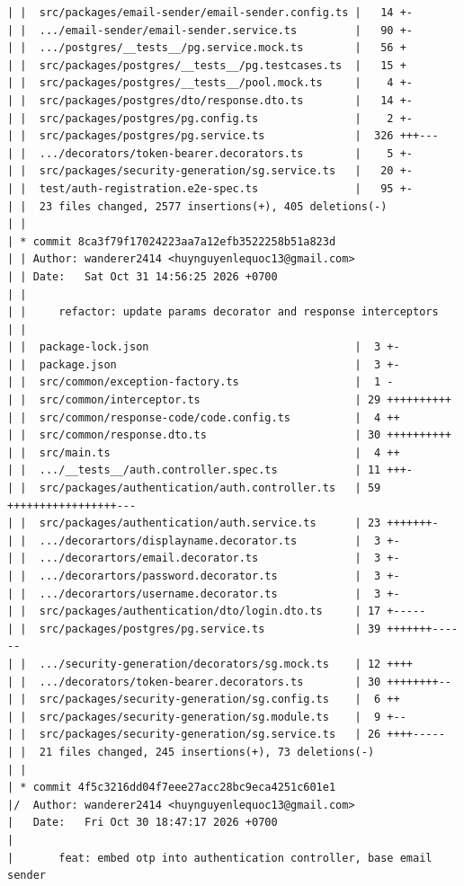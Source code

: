 \documentclass[12pt]{article}
\begin{document}
\begin{lstlisting}[numbers=none,breaklines=true]
| |  src/packages/email-sender/email-sender.config.ts |   14 +-
| |  .../email-sender/email-sender.service.ts         |   90 +-
| |  .../postgres/__tests__/pg.service.mock.ts        |   56 +
| |  src/packages/postgres/__tests__/pg.testcases.ts  |   15 +
| |  src/packages/postgres/__tests__/pool.mock.ts     |    4 +-
| |  src/packages/postgres/dto/response.dto.ts        |   14 +-
| |  src/packages/postgres/pg.config.ts               |    2 +-
| |  src/packages/postgres/pg.service.ts              |  326 +++---
| |  .../decorators/token-bearer.decorators.ts        |    5 +-
| |  src/packages/security-generation/sg.service.ts   |   20 +-
| |  test/auth-registration.e2e-spec.ts               |   95 +-
| |  23 files changed, 2577 insertions(+), 405 deletions(-)
| |
| * commit 8ca3f79f17024223aa7a12efb3522258b51a823d
| | Author: wanderer2414 <huynguyenlequoc13@gmail.com>
| | Date:   Sat Oct 31 14:56:25 2026 +0700
| |
| |     refactor: update params decorator and response interceptors
| |
| |  package-lock.json                                |  3 +-
| |  package.json                                     |  3 +-
| |  src/common/exception-factory.ts                  |  1 -
| |  src/common/interceptor.ts                        | 29 ++++++++++
| |  src/common/response-code/code.config.ts          |  4 ++
| |  src/common/response.dto.ts                       | 30 ++++++++++
| |  src/main.ts                                      |  4 ++
| |  .../__tests__/auth.controller.spec.ts            | 11 +++-
| |  src/packages/authentication/auth.controller.ts   | 59 +++++++++++++++++---
| |  src/packages/authentication/auth.service.ts      | 23 +++++++-
| |  .../decorartors/displayname.decorator.ts         |  3 +-
| |  .../decorartors/email.decorator.ts               |  3 +-
| |  .../decorartors/password.decorator.ts            |  3 +-
| |  .../decorartors/username.decorator.ts            |  3 +-
| |  src/packages/authentication/dto/login.dto.ts     | 17 +-----
| |  src/packages/postgres/pg.service.ts              | 39 +++++++------
| |  .../security-generation/decorators/sg.mock.ts    | 12 ++++
| |  .../decorators/token-bearer.decorators.ts        | 30 ++++++++--
| |  src/packages/security-generation/sg.config.ts    |  6 ++
| |  src/packages/security-generation/sg.module.ts    |  9 +--
| |  src/packages/security-generation/sg.service.ts   | 26 ++++-----
| |  21 files changed, 245 insertions(+), 73 deletions(-)
| |
| * commit 4f5c3216dd04f7eee27acc28bc9eca4251c601e1
|/  Author: wanderer2414 <huynguyenlequoc13@gmail.com>
|   Date:   Fri Oct 30 18:47:17 2026 +0700
|
|       feat: embed otp into authentication controller, base email sender

\end{lstlisting}
\end{document}
